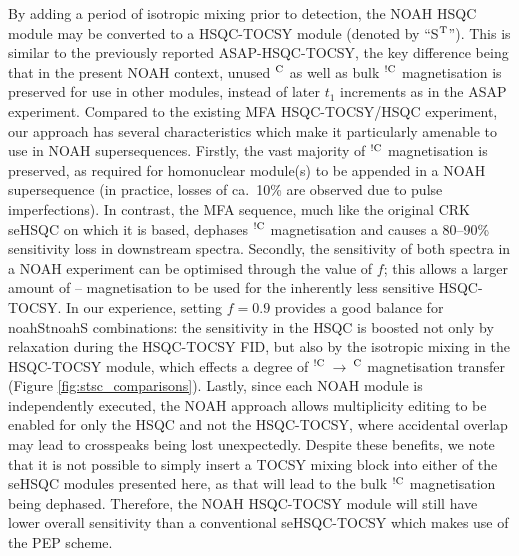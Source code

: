 \documentclass[11pt]{article}
\newcommand*{\noahtwo}[2]{\csname noah#1\endcsname\csname noah#2\endcsname}
\newcommand*{\noahSt}{S$\rm ^T$}
\newcommand*{\hl}[1]{\textcolor{WildStrawberry}{#1}}
\newcommand*{\carbon}{\ce{^{13}C}}
\newcommand*{\proton}{\ce{^{1}H}}
\newcommand*{\magn}[1]{\ce{^1H}$^{#1}$}
\newcommand*{\magnnot}[1]{\ce{^1H}$^{!#1}$}
\newcommand*{\figref}[1]{Figure \ref{fig:#1}}
\begin{document}
By adding a period of isotropic mixing prior to detection, the NOAH HSQC module may be converted to a HSQC-TOCSY module (denoted by ``\noahSt{}'').
This is similar to the previously reported ASAP-HSQC-TOCSY,\autocite{Becker2019JMR} the key difference being that in the present NOAH context, unused \magn{\ce{C}} as well as bulk \magnnot{\ce{C}} magnetisation is preserved for use in other modules, instead of later $t_1$ increments as in the ASAP experiment.
Compared to the existing MFA HSQC-TOCSY/HSQC experiment,\autocite{Nolis2019CPC} our approach has several characteristics which make it particularly amenable to use in NOAH supersequences.
Firstly, the vast majority of \magnnot{\ce{C}} magnetisation is preserved, as required for homonuclear module(s) to be appended in a NOAH supersequence (in practice, losses of ca.\ 10\% are observed due to pulse imperfections).
In contrast, the MFA sequence, much like the original CRK seHSQC on which it is based, dephases \magnnot{\ce{C}} magnetisation and causes a 80--90\% sensitivity loss in downstream spectra.
Secondly, the sensitivity of both spectra in a NOAH experiment can be optimised through the value of $f$; this allows a larger amount of \carbon{}--\proton{} magnetisation to be used for the inherently less sensitive HSQC-TOCSY.
In our experience, setting $f = 0.9$ provides a good balance for \noahtwo{St}{S} combinations: the sensitivity in the HSQC is boosted not only by relaxation during the HSQC-TOCSY FID, but also by the isotropic mixing in the HSQC-TOCSY module, which effects a degree of \magnnot{\ce{C}}\,$\to\,$\magn{\ce{C}} magnetisation transfer (\figref{stsc_comparisons}).
Lastly, since each NOAH module is independently executed, the NOAH approach allows multiplicity editing to be enabled for only the HSQC and not the HSQC-TOCSY, where accidental overlap may lead to crosspeaks being lost unexpectedly.
Despite these benefits, we note that it is not possible to simply insert a TOCSY mixing block into \hl{either of the} seHSQC modules presented here, as that will lead to the bulk \magnnot{\ce{C}} magnetisation being dephased.
Therefore, the NOAH HSQC-TOCSY module will still have lower overall sensitivity than a conventional seHSQC-TOCSY which makes use of the PEP scheme.

\end{document}
